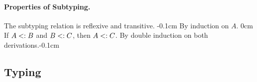 \paragraph{Properties of Subtyping.} The subtyping relation is reflexive and transitive.
{-0.1cm}
{By induction on $A$.}
{0cm}
{If $A <: B$ and $B <: C$, then $A <: C$.}
{By double induction on both derivations.}{-0.1cm}

%
%
\subsection{Typing}


